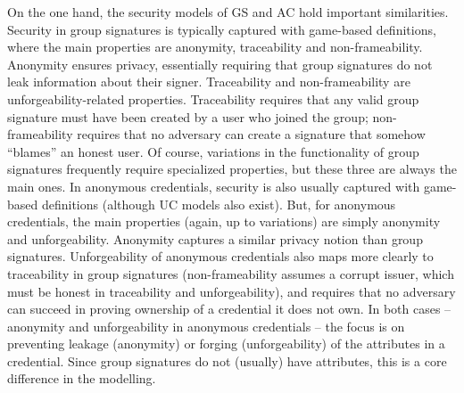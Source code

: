 On the one hand, the security models of GS and AC hold important similarities.
Security in group signatures is typically captured with game-based definitions,
where the main properties are anonymity, traceability and non-frameability.
Anonymity ensures privacy, essentially requiring that group signatures do not
leak information about their signer. Traceability and non-frameability are
unforgeability-related properties. Traceability requires that any valid group
signature must have been created by a user who joined the group;
non-frameability requires that no adversary can create a signature that somehow
``blames'' an honest user. Of course, variations in the functionality of group
signatures frequently require specialized properties, but these three are always
the main ones. In anonymous credentials, security is also usually captured with
game-based definitions (although UC models also exist). But, for anonymous
credentials, the main properties (again, up to variations) are simply anonymity
and unforgeability. Anonymity captures a similar privacy notion than group
signatures. Unforgeability of anonymous credentials also maps more clearly to
traceability in group signatures (non-frameability assumes a corrupt issuer,
which must be honest in traceability and unforgeability), and requires that
no adversary can succeed in proving ownership of a credential it does not own.
In both cases -- anonymity and unforgeability in anonymous credentials -- the
focus is on preventing leakage (anonymity) or forging (unforgeability) of the
attributes in a credential. Since group signatures do not (usually) have
attributes, this is a core difference in the modelling.

